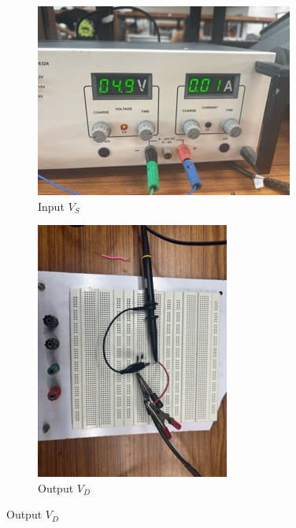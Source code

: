 \documentclass[12pt,a4paper]{article}
\begin{document}
\begin{figure}[h!]
\centering
\begin{subfigure}[b]{0.47\linewidth}
    \centering
    \includegraphics[width=\textwidth]{Experiment_5/figs/iv_dc_3 Small.jpeg}
    \caption{Input $V_S$}
\end{subfigure}
\begin{subfigure}[b]{0.48\linewidth}
    \centering
    \includegraphics[angle=90, width=\textwidth]{Experiment_5/figs/iv_ckt_3 Small.jpeg}
    \caption{Output $V_D$}
\end{subfigure}
\end{figure}
\end{document}
